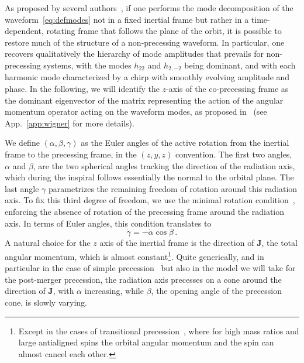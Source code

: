 \documentclass[aps,showpacs,twocolumn,
prd,superscriptaddress,nofootinbib]{revtex4-1}
\newcommand{\be}{\begin{equation}}
\newcommand{\ee}{\end{equation}}
\begin{document}
As proposed by several authors~\cite{BCV03b, BCPTV05, Schmidt+10, OShaughnessy+11, Boyle+11}, if one performs the mode decomposition of the waveform~\eqref{eq:defmodes} not in a fixed inertial frame but rather in a time-dependent, rotating frame that follows the plane of the orbit, it is possible to restore much of the structure of a non-precessing waveform. In particular, one recovers qualitatively the hierarchy of mode amplitudes that prevails for non-precessing systems, with the modes $h_{22}$ and $h_{2,-2}$ being dominant, and with each harmonic mode characterized by a chirp with smoothly evolving amplitude and phase. In the following, we will identify the $z$-axis of the co-precessing frame as the dominant eigenvector of the matrix representing the action of the angular momentum operator acting on the waveform modes, as proposed in~\cite{OShaughnessy+11} (see App.~\ref{app:wigner} for more details).

We define $(\alpha, \beta, \gamma)$ as the Euler angles of the active rotation from the inertial frame to the precessing frame, in the $(z,y,z)$ convention. The first two angles, $\alpha$ and $\beta$, are the two spherical angles tracking the direction of the radiation axis, which during the inspiral follows essentially the normal to the orbital plane. The last angle $\gamma$ parametrizes the remaining freedom of rotation around this radiation axis. To fix this third degree of freedom, we use the minimal rotation condition~\cite{Boyle+11}, enforcing the absence of rotation of the precessing frame around the radiation axis. In terms of Euler angles, this condition translates to
\be\label{eq:gammadot}
	\dot{\gamma} = -\dot{\alpha}\cos \beta \,.
\ee
A natural choice for the $z$ axis of the inertial frame is the direction of $\bm{J}$, the total angular momentum, which is almost constant\footnote{Except in the cases of transitional precession~\cite{Apostolatos+94}, where for high mass ratios and large antialigned spins the orbital angular momentum and the spin can almost cancel each other.}. Quite generically, and in particular in the case of simple precession~\cite{Apostolatos+94, Kidder95} but also in the model we will take for the post-merger precession, the radiation axis precesses on a cone around the direction of $\bm{J}$, with $\alpha$ increasing, while $\beta$, the opening angle of the precession cone, is slowly varying.
\end{document}
